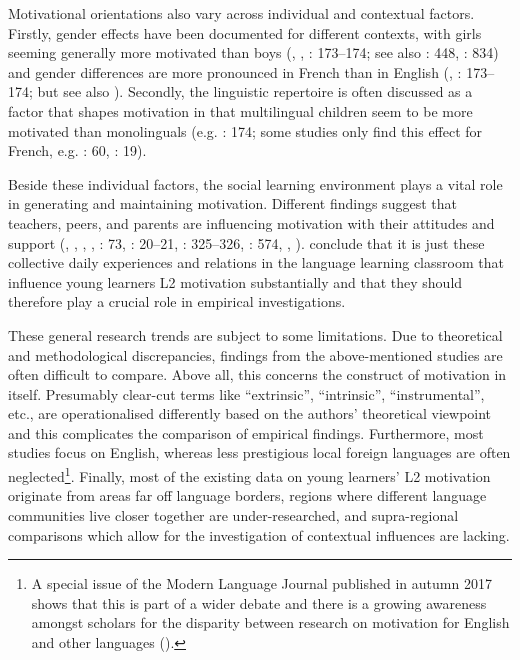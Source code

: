 \documentclass[output=paper]{langsci/langscibook}
\begin{document}
Motivational orientations also vary across individual and contextual factors. Firstly, gender effects have been documented for different contexts, with girls seeming generally more motivated than boys (\citealt{Heinzmann2009}, \citealt{Henry2009,Henry2010}, \citealt{BruehwilerLePapeRacine2017}: 173--174; see also \citealt{DoernyeiCsizer2002}: 448, \citealt{CourtneyEtAl2017}: 834) and gender differences are more pronounced in French than in English (\citealt{Holder2005}, \citealt{BruehwilerLePapeRacine2017}: 173--174; but see also \citealt{DewaeleEtAl2016}). Secondly, the linguistic repertoire is often discussed as a factor that shapes motivation in that multilingual children seem to be more motivated than monolinguals (e.g. \citealt{BruehwilerLePapeRacine2017}: 174; some studies only find this effect for French, e.g. \citealt{Stoeckli2004}: 60, \citealt{Heinzmann2010}: 19).\largerpage

Beside these individual factors, the social learning environment plays a vital role in generating and maintaining motivation. Different findings suggest that teachers, peers, and parents are influencing motivation with their attitudes and support (\citealt{NoelsEtAl1999}, \citealt{CsizerKormos2008,CsizerKormos2009}, \citealt{HusfeldtBaderLehmann2009}, \citealt{TaguchiEtAl2009}, \citealt{Iwaniec2014}: 73, \citealt{PeyerEtAl2016}: 20--21, \citealt{PfenningerSingleton2016}: 325--326, \citealt{Busse2017}: 574, \citealt{SugitaMcEownEtAl2017}, \citealt{WiedenkellerLenz2019}). \citet[336]{PfenningerSingleton2016} conclude that it is just these collective daily experiences and relations in the language learning classroom that influence young learners L2 motivation substantially and that they should therefore play a crucial role in empirical investigations.

These general research trends are subject to some limitations. Due to theoretical and methodological discrepancies, findings from the above-mentioned studies are often difficult to compare. Above all, this concerns the construct of motivation in itself. Presumably clear-cut terms like “extrinsic”, “intrinsic”, “instrumental”, etc., are operationalised differently based on the authors’ theoretical viewpoint and this complicates the comparison of empirical findings. Furthermore, most studies focus on English, whereas less prestigious local foreign languages are often neglected\footnote{A special issue of the Modern Language Journal published in autumn 2017 shows that this is part of a wider debate and there is a growing awareness amongst scholars for the disparity between research on motivation for English and other languages (\citealt{UshiodaDoernyei2017}).}. Finally, most of the existing data on young learners’ L2 motivation originate from areas far off language borders, regions where different language communities live closer together are under-researched, and supra-regional comparisons which allow for the investigation of contextual influences are lacking.
\end{document}
